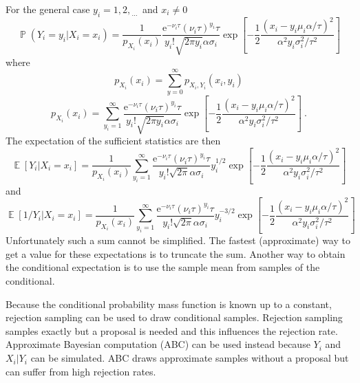\documentclass[12pt]{report}
\DeclareMathOperator{\expectation}{\mathbb{E}}
\DeclareMathOperator{\prob}{\mathbb{P}}
\newcommand{\euler}{\mathrm{e}}
\newcommand{\dotdotdot}{_{\phantom{.}\cdots}}
\begin{document}
For the general case $y_i=1,2,\dotdotdot$ and $x_i\neq0$
\begin{equation}
\prob\left(Y_i=y_i|X_i=x_i\right)=\frac{1}{p_{X_i}(x_i)}\dfrac{\euler^{-\nu_i\tau}(\nu_i\tau)^{y_i}\tau}{y_i!\sqrt{2\pi y_i}\alpha\sigma_i}
\exp\left[-\dfrac{1}{2}\dfrac{\left(x_i-y_i\mu_i\alpha/\tau\right)^2}{\alpha^2y_i\sigma_i^2/\tau^2}\right]
\end{equation}
where
\begin{equation*}
p_{X_i}(x_i)=\sum_{y=0}^{\infty}p_{X_i,Y_i}(x_i,y_i)
\end{equation*}
\begin{equation}
p_{X_i}(x_i)=\sum_{y_i=1}^{\infty}\dfrac{\euler^{-\nu_i\tau}(\nu_i\tau)^{y_i}\tau}{y_i!\sqrt{2\pi y_i}\alpha\sigma_i}
\exp\left[-\dfrac{1}{2}\dfrac{\left(x_i-y_i\mu_i\alpha/\tau\right)^2}{\alpha^2y_i\sigma_i^2/\tau^2}\right] \ .
\end{equation}
The expectation of the sufficient statistics are then
\begin{equation}
\expectation\left[Y_i|X_i=x_i\right]=
\frac{1}{p_{X_i}(x_i)}
\sum_{y_i=1}^{\infty}\dfrac{\euler^{-\nu_i\tau}(\nu_i\tau)^{y_i}\tau}{y_i!\sqrt{2\pi}\alpha\sigma_i}y_i^{1/2}
\exp\left[-\dfrac{1}{2}\dfrac{\left(x_i-y_i\mu_i\alpha/\tau\right)^2}{\alpha^2y_i\sigma_i^2/\tau^2}\right]
\end{equation}
and
\begin{equation}
\expectation\left[1/Y_i|X_i=x_i\right]=
\frac{1}{p_{X_i}(x_i)}
\sum_{y_i=1}^{\infty}\dfrac{\euler^{-\nu_i\tau}(\nu_i\tau)^{y_i}\tau}{y_i!\sqrt{2\pi}\alpha\sigma_i}y_i^{-3/2}
\exp\left[-\dfrac{1}{2}\dfrac{\left(x_i-y_i\mu_i\alpha/\tau\right)^2}{\alpha^2y_i\sigma_i^2/\tau^2}\right]
\end{equation}
Unfortunately such a sum cannot be simplified. The fastest (approximate) way to get a value for these expectations is to truncate the sum. Another way to obtain the conditional expectation is to use the sample mean from samples of the conditional.

Because the conditional probability mass function is known up to a constant, rejection sampling can be used to draw conditional samples. Rejection sampling samples exactly but a proposal is needed and this influences the rejection rate. Approximate Bayesian computation (ABC) can be used instead because $Y_i$ and $X_i|Y_i$ can be simulated. ABC draws approximate samples without a proposal but can suffer from high rejection rates.
\end{document}
